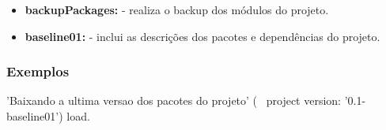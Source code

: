 \begin{itemize}
 \item \textbf{backupPackages:} - realiza o backup dos módulos do projeto.
 \item \textbf{baseline01:} -  inclui as descrições dos pacotes e dependências do projeto.
\end{itemize}

\subsubsection{Exemplos}

\begin{godCode}
'Baixando a ultima versao dos pacotes do projeto'
(\configGod~ project version: '0.1-baseline01') load.
\end{godCode}


